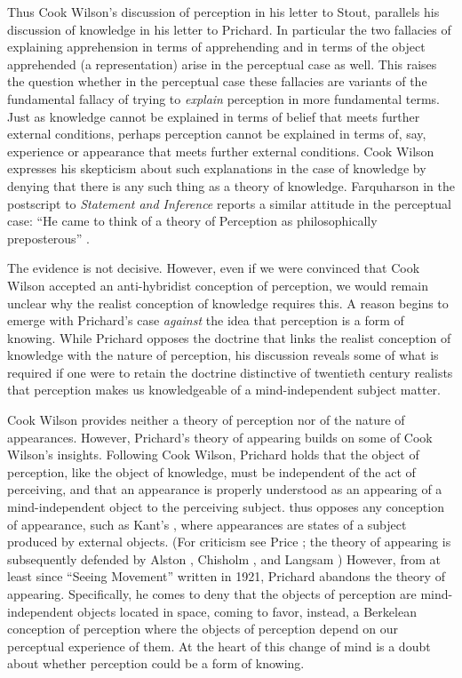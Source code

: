 Thus Cook Wilson's discussion of perception in his letter to Stout, parallels his discussion of knowledge in his letter to Prichard. In particular the two fallacies of explaining apprehension in terms of apprehending and in terms of the object apprehended (a representation) arise in the perceptual case as well. This raises the question whether in the perceptual case these fallacies are variants of the fundamental fallacy of trying to \emph{explain} perception in more fundamental terms. Just as knowledge cannot be explained in terms of belief that meets further  external conditions, perhaps perception cannot be explained in terms of, say, experience or appearance that meets further external conditions. Cook Wilson expresses his skepticism about such explanations in the case of knowledge by denying that there is any such thing as a theory of knowledge. Farquharson in the postscript to \emph{Statement and Inference} reports a similar attitude in the perceptual case: ``He came to think of a theory of Perception as philosophically preposterous'' \citep[882]{Cook-Wilson:1926sf}. 

The evidence is not decisive. However, even if we were convinced that Cook Wilson accepted an anti-hybridist conception of perception, we would remain unclear why the realist conception of knowledge requires this. A reason begins to emerge with Prichard's case \emph{against} the idea that perception is a form of knowing. While Prichard opposes the doctrine that links the realist conception of knowledge with the nature of perception, his discussion reveals some of what is required if one were to retain the doctrine distinctive of twentieth century realists that perception makes us knowledgeable of a mind-independent subject matter.

Cook Wilson provides neither a theory of perception nor of the nature of appearances. However, Prichard's \citeyearpar{Prichard:1906gf,Prichard:1909yg} theory of appearing builds on some of Cook Wilson's insights. Following Cook Wilson, Prichard holds that the object of perception, like the object of knowledge, must be independent of the act of perceiving, and that an appearance is properly understood as an appearing of a mind-independent object to the perceiving subject. \citet{Prichard:1909yg} thus opposes any conception of appearance, such as Kant's \citeyearpar{Kant1781Critique-of-Pur}, where appearances are states of a subject produced by external objects. (For criticism see Price \citeyear{Price:1932fk}; the theory of appearing is subsequently defended by Alston \citeyear{Alston:1993zl}, Chisholm \citeyear{Chisholm:1950rj}, and Langsam \citeyear{Langsam:1997md}) However, from at least since ``Seeing Movement'' written in 1921, Prichard abandons the theory of appearing. Specifically, he comes to deny that the objects of perception are mind-independent objects located in space, coming to favor, instead, a Berkelean conception of perception where the objects of perception depend on our perceptual experience of them. At the heart of this change of mind is a doubt about whether perception could be a form of knowing.

